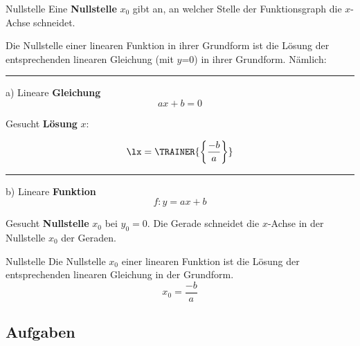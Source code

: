 \begin{definition}{Nullstelle}{}
  Eine \textbf{Nullstelle} $x_0$ gibt an, an welcher Stelle der Funktionsgraph die $x$-Achse schneidet.
\end{definition}


Die Nullstelle einer linearen Funktion in ihrer Grundform ist die Lösung der entsprechenden linearen Gleichung (mit
$y$=0) in ihrer Grundform. Nämlich:

\hrule

a) Lineare \textbf{Gleichung} $$ax+b=0$$

Gesucht \textbf{Lösung} $x$:


\vspace{1mm}


$$\lx = \TRAINER{\left\{\frac{-b}{a}\right\}}  $$

\hrule

b) Lineare \textbf{Funktion} $$f: y=ax+b$$

Gesucht \textbf{Nullstelle} $x_0$ bei $y_0=0$. Die Gerade schneidet
die $x$-Achse in der Nullstelle $x_0$ der Geraden.

\begin{gesetz}{Nullstelle}{}
  Die Nullstelle $x_0$ einer linearen Funktion ist die Lösung der
  entsprechenden linearen Gleichung in der Grundform.  
  $$x_0 = \frac{-b}{a}$$
\end{gesetz}

\newpage

\subsection*{Aufgaben}



\newpage

